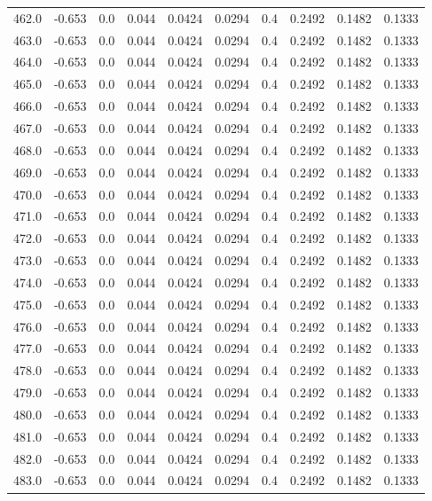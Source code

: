 \begin{longtable}{lrrrrrrrrr}
462.0 & -0.653 & 0.0 & 0.044 & 0.0424 & 0.0294 & 0.4 & 0.2492 & 0.1482 & 0.1333 \\
463.0 & -0.653 & 0.0 & 0.044 & 0.0424 & 0.0294 & 0.4 & 0.2492 & 0.1482 & 0.1333 \\
464.0 & -0.653 & 0.0 & 0.044 & 0.0424 & 0.0294 & 0.4 & 0.2492 & 0.1482 & 0.1333 \\
465.0 & -0.653 & 0.0 & 0.044 & 0.0424 & 0.0294 & 0.4 & 0.2492 & 0.1482 & 0.1333 \\
466.0 & -0.653 & 0.0 & 0.044 & 0.0424 & 0.0294 & 0.4 & 0.2492 & 0.1482 & 0.1333 \\
467.0 & -0.653 & 0.0 & 0.044 & 0.0424 & 0.0294 & 0.4 & 0.2492 & 0.1482 & 0.1333 \\
468.0 & -0.653 & 0.0 & 0.044 & 0.0424 & 0.0294 & 0.4 & 0.2492 & 0.1482 & 0.1333 \\
469.0 & -0.653 & 0.0 & 0.044 & 0.0424 & 0.0294 & 0.4 & 0.2492 & 0.1482 & 0.1333 \\
470.0 & -0.653 & 0.0 & 0.044 & 0.0424 & 0.0294 & 0.4 & 0.2492 & 0.1482 & 0.1333 \\
471.0 & -0.653 & 0.0 & 0.044 & 0.0424 & 0.0294 & 0.4 & 0.2492 & 0.1482 & 0.1333 \\
472.0 & -0.653 & 0.0 & 0.044 & 0.0424 & 0.0294 & 0.4 & 0.2492 & 0.1482 & 0.1333 \\
473.0 & -0.653 & 0.0 & 0.044 & 0.0424 & 0.0294 & 0.4 & 0.2492 & 0.1482 & 0.1333 \\
474.0 & -0.653 & 0.0 & 0.044 & 0.0424 & 0.0294 & 0.4 & 0.2492 & 0.1482 & 0.1333 \\
475.0 & -0.653 & 0.0 & 0.044 & 0.0424 & 0.0294 & 0.4 & 0.2492 & 0.1482 & 0.1333 \\
476.0 & -0.653 & 0.0 & 0.044 & 0.0424 & 0.0294 & 0.4 & 0.2492 & 0.1482 & 0.1333 \\
477.0 & -0.653 & 0.0 & 0.044 & 0.0424 & 0.0294 & 0.4 & 0.2492 & 0.1482 & 0.1333 \\
478.0 & -0.653 & 0.0 & 0.044 & 0.0424 & 0.0294 & 0.4 & 0.2492 & 0.1482 & 0.1333 \\
479.0 & -0.653 & 0.0 & 0.044 & 0.0424 & 0.0294 & 0.4 & 0.2492 & 0.1482 & 0.1333 \\
480.0 & -0.653 & 0.0 & 0.044 & 0.0424 & 0.0294 & 0.4 & 0.2492 & 0.1482 & 0.1333 \\
481.0 & -0.653 & 0.0 & 0.044 & 0.0424 & 0.0294 & 0.4 & 0.2492 & 0.1482 & 0.1333 \\
482.0 & -0.653 & 0.0 & 0.044 & 0.0424 & 0.0294 & 0.4 & 0.2492 & 0.1482 & 0.1333 \\
483.0 & -0.653 & 0.0 & 0.044 & 0.0424 & 0.0294 & 0.4 & 0.2492 & 0.1482 & 0.1333 \\

\end{longtable}
